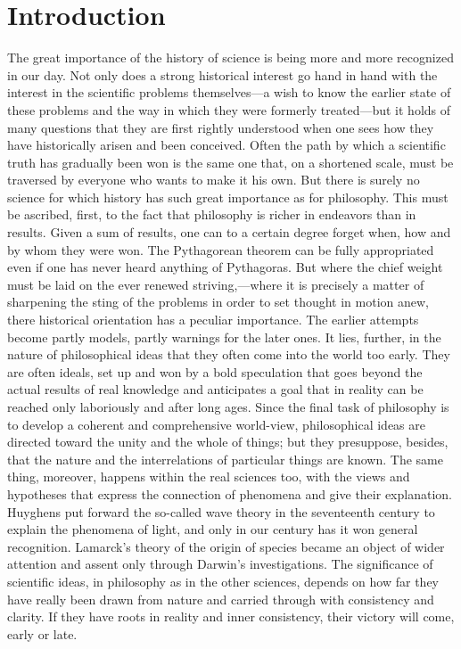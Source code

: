 \documentclass[12pt]{book}
\newcommand{\opage}[1]{\marginnote{\footnotesize\textit{[#1]}}}
\begin{document}
\mainmatter
\chapter*{Introduction}
\opage{1}The great importance of the history of science is being more and more
recognized in our day. Not only does a strong historical interest go hand in hand
with the interest in the scientific problems themselves---a wish to know the
earlier state of these problems and the way in which they were formerly
treated---but it holds of many questions that they are first rightly understood
when one sees how they have historically arisen and been conceived. Often the path
by which a scientific truth has gradually been won is the same one that, on a
shortened scale, must be traversed by everyone who wants to make it his own. But
there is surely no science for which history has such great importance as for
philosophy. This must be ascribed, first, to the fact that philosophy is richer in
endeavors than in results. Given a sum of results, one can to a certain degree
forget when, how and by whom they were won. The Pythagorean theorem can be fully
appropriated even if one has never heard anything of Pythagoras. But where the
chief weight must be laid on the ever renewed striving,---where it is precisely a
matter of \opage{2}sharpening the sting of the problems in order to set thought in
motion anew, there historical orientation has a peculiar importance. The earlier
attempts become partly models, partly warnings for the later ones. It lies,
further, in the nature of philosophical ideas that they often come into the world
too early. They are often ideals, set up and won by a bold speculation that goes
beyond the actual results of real knowledge and anticipates a goal that in reality
can be reached only laboriously and after long ages. Since the final task of
philosophy is to develop a coherent and comprehensive world-view, philosophical
ideas are directed toward the unity and the whole of things; but they presuppose,
besides, that the nature and the interrelations of particular things are known.
The same thing, moreover, happens within the real sciences too, with the views and
hypotheses that express the connection of phenomena and give their explanation.
Huyghens put forward the so-called wave theory in the seventeenth century to
explain the phenomena of light, and only in our century has it won general
recognition. Lamarck's theory of the origin of species became an object of wider
attention and assent only through Darwin's investigations. The significance of
scientific ideas, in philosophy as in the other sciences, depends on how far they
have really been drawn from nature and carried through with consistency and
clarity. If they have roots in reality and inner consistency, their victory will
come, early or late.
\end{document}

